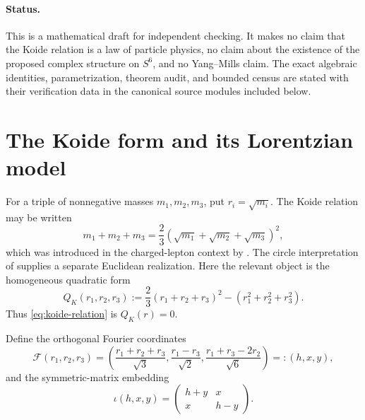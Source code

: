 \documentclass[11pt]{article}
\numberwithin{equation}{section}
\theoremstyle{definition}
\theoremstyle{remark}
\begin{document}
\paragraph{Status.}
This is a mathematical draft for independent checking.  It makes no claim that the Koide relation is a law of particle physics, no claim about the existence of the proposed complex structure on $S^6$, and no Yang--Mills claim.  The exact algebraic identities, parametrization, theorem audit, and bounded census are stated with their verification data in the canonical source modules included below.

\section{The Koide form and its Lorentzian model}

For a triple of nonnegative masses $m_1,m_2,m_3$, put $r_i=\sqrt{m_i}$.  The Koide relation may be written
\begin{equation}\label{eq:koide-relation}
 m_1+m_2+m_3=\frac23\left(\sqrt{m_1}+\sqrt{m_2}+\sqrt{m_3}\right)^2,
\end{equation}
which was introduced in the charged-lepton context by \citet{Koide_1983}.  The circle interpretation of \citet{Kocik_2012} supplies a separate Euclidean realization.  Here the relevant object is the homogeneous quadratic form
\begin{equation}\label{eq:QK}
 Q_K(r_1,r_2,r_3)
 :=\frac23(r_1+r_2+r_3)^2-(r_1^2+r_2^2+r_3^2).
\end{equation}
Thus \eqref{eq:koide-relation} is $Q_K(r)=0$.

Define the orthogonal Fourier coordinates
\begin{equation}\label{eq:Fourier}
 \mathcal F(r_1,r_2,r_3)
 =\left(
 \frac{r_1+r_2+r_3}{\sqrt3},
 \frac{r_1-r_3}{\sqrt2},
 \frac{r_1+r_3-2r_2}{\sqrt6}
 \right)=:(h,x,y),
\end{equation}
and the symmetric-matrix embedding
\begin{equation}\label{eq:iota}
 \iota(h,x,y)=
 \begin{pmatrix}h+y&x\\x&h-y\end{pmatrix}.
\end{equation}
\end{document}
